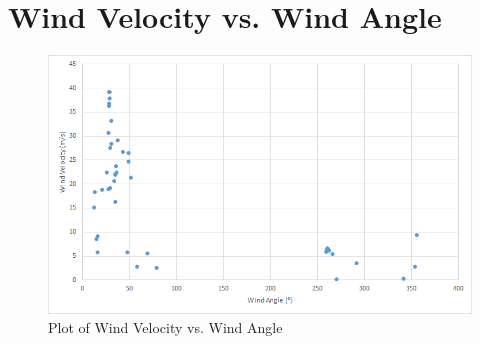 \documentclass{journal}
\begin{document}
\part{Wind Velocity vs. Wind Angle}
\begin{figure}[H]
  \centering
  \includegraphics[width=\textwidth]{alan-data.png}
  \caption{Plot of Wind Velocity vs. Wind Angle}
\end{figure}
\end{document}
